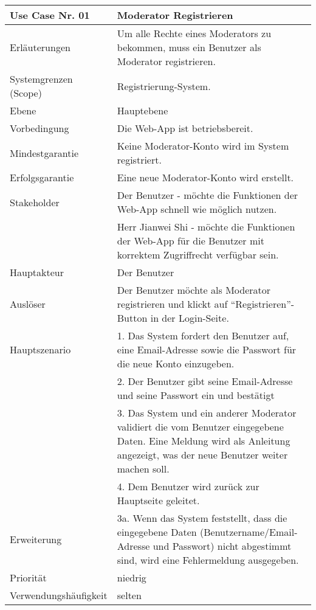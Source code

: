 \begin{tabularx}{\linewidth}{|l|X|}
	\hline
	Use Case Nr. 01			& \textbf{Moderator Registrieren} \\ \hline
	Erläuterungen			& Um alle Rechte eines Moderators zu bekommen, muss ein 
							Benutzer als Moderator registrieren. \\ \hline
	Systemgrenzen (Scope)	& Registrierung-System. \\ \hline
	Ebene					& Hauptebene \\ \hline
	Vorbedingung			& Die Web-App ist betriebsbereit. \\ \hline
	Mindestgarantie			& Keine Moderator-Konto wird im System registriert. \\ \hline
	Erfolgsgarantie			& Eine neue Moderator-Konto wird erstellt. \\ \hline
	Stakeholder				& Der Benutzer - möchte die Funktionen der Web-App schnell 
							  wie möglich nutzen. \\
							& Herr Jianwei Shi - möchte die Funktionen der Web-App für die 
							  Benutzer mit korrektem Zugriffrecht verfügbar sein.\\ \hline
	Hauptakteur				& Der Benutzer \\ \hline
	Auslöser				& Der Benutzer möchte als Moderator registrieren und klickt 
							  auf ``Registrieren''-Button in der Login-Seite. \\ \hline	
	Hauptszenario			& 1. Das System fordert den Benutzer auf, eine Email-Adresse 
							  sowie die Passwort für die neue Konto einzugeben. \\
							& 2. Der Benutzer gibt seine Email-Adresse und seine Passwort 
							  ein und bestätigt \\
							& 3. Das System und ein anderer Moderator validiert die vom 
							  Benutzer eingegebene Daten. Eine Meldung wird als 
							  Anleitung angezeigt, was der neue Benutzer weiter machen soll. \\
							& 4. Dem Benutzer wird zurück zur Hauptseite geleitet. 
							  \\ \hline
	Erweiterung				& 3a. Wenn das System feststellt, dass die eingegebene Daten 
							  (Benutzername/Email-Adresse und Passwort) nicht abgestimmt sind, wird eine Fehlermeldung ausgegeben. \\ \hline
	Priorität				& niedrig \\ \hline
	Verwendungshäufigkeit	& selten \\ \hline
\end{tabularx}
